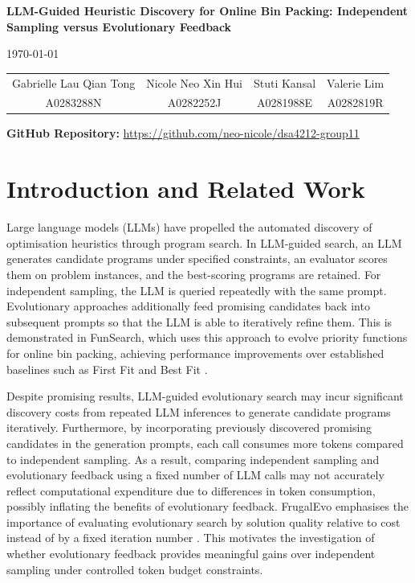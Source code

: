\documentclass[12pt]{article}
\begin{document}
\begin{center}
    {\Large\bfseries
    LLM-Guided Heuristic Discovery for Online Bin Packing:
    Independent Sampling versus Evolutionary Feedback
    \par}

    \vspace{0.2cm}
    {\normalsize \today}

    \vspace{0.2cm}

    \begin{tabular}{cccc}
        Gabrielle Lau Qian Tong & Nicole Neo Xin Hui &
        Stuti Kansal & Valerie Lim \\
        A0283288N & A0282252J &
        A0281988E & A0282819R
    \end{tabular}

    \vspace{0.2cm}

    \textbf{GitHub Repository:}
    \url{https://github.com/neo-nicole/dsa4212-group11}
\end{center}

\vspace{0.1cm}

\section{Introduction and Related Work}
Large language models (LLMs) have propelled the automated discovery of optimisation heuristics through program search. In LLM-guided search, an LLM generates candidate programs under specified constraints, an evaluator scores them on problem instances, and the best-scoring programs are retained. For independent sampling, the LLM is queried repeatedly with the same prompt. Evolutionary approaches additionally feed promising candidates back into subsequent prompts so that the LLM is able to iteratively refine them. This is demonstrated in FunSearch, which uses this approach to evolve priority functions for online bin packing, achieving performance improvements over established baselines such as First Fit and Best Fit \citep{romera2023}.

Despite promising results, LLM-guided evolutionary search may incur significant discovery costs from repeated LLM inferences to generate candidate programs iteratively. Furthermore, by incorporating previously discovered promising candidates in the generation prompts, each call consumes more tokens compared to independent sampling. As a result, comparing independent sampling and evolutionary feedback using a fixed number of LLM calls may not accurately reflect computational expenditure due to differences in token consumption, possibly inflating the benefits of evolutionary feedback. FrugalEvo emphasises the importance of evaluating evolutionary search by solution quality relative to cost instead of by a fixed iteration number \citep{chen2026}. This motivates the investigation of whether evolutionary feedback provides meaningful gains over independent sampling under controlled token budget constraints.
\end{document}
